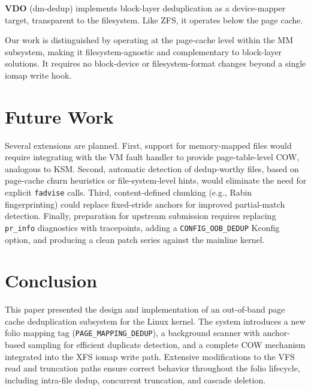 \documentclass[conference]{IEEEtran}
\begin{document}
\textbf{VDO} (dm-dedup) implements block-layer deduplication as a device-mapper target, transparent to the filesystem. Like ZFS, it operates below the page cache.

Our work is distinguished by operating at the page-cache level within the MM subsystem, making it filesystem-agnostic and complementary to block-layer solutions. It requires no block-device or filesystem-format changes beyond a single iomap write hook.

\section{Future Work}
\label{sec:future}

Several extensions are planned. First, support for memory-mapped files would require integrating with the VM fault handler to provide page-table-level COW, analogous to KSM. Second, automatic detection of dedup-worthy files, based on page-cache churn heuristics or file-system-level hints, would eliminate the need for explicit \texttt{fadvise} calls. Third, content-defined chunking (e.g., Rabin fingerprinting) could replace fixed-stride anchors for improved partial-match detection. Finally, preparation for upstream submission requires replacing \texttt{pr\_info} diagnostics with tracepoints, adding a \texttt{CONFIG\_OOB\_DEDUP} Kconfig option, and producing a clean patch series against the mainline kernel.

\section{Conclusion}
\label{sec:conclusion}

This paper presented the design and implementation of an out-of-band page cache deduplication subsystem for the Linux kernel. The system introduces a new folio mapping tag (\texttt{PAGE\_MAPPING\_DEDUP}), a background scanner with anchor-based sampling for efficient duplicate detection, and a complete COW mechanism integrated into the XFS iomap write path. Extensive modifications to the VFS read and truncation paths ensure correct behavior throughout the folio lifecycle, including intra-file dedup, concurrent truncation, and cascade deletion.
\end{document}
